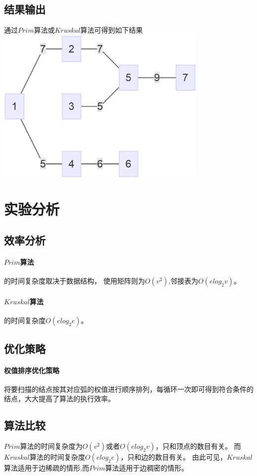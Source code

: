 \documentclass[a4paper,10pt]{ctexart}
\begin{document}
\subsection{结果输出}
通过$Prim$算法或$Kruskal$算法可得到如下结果\\
\includegraphics[height=3in]{../Pics/Test-MiniTree-out.eps}

\section{实验分析}
\subsection{效率分析}
\paragraph{$Prim$算法}的时间复杂度取决于数据结构，
使用矩阵则为$O(v^2)$,邻接表为$O(elog_2v)$。
\paragraph{$Kruskal$算法}的时间复杂度$O(elog_2e)$。

\subsection{优化策略}
\paragraph{权值排序优化策略}
将要扫描的结点按其对应弧的权值进行顺序排列，每循环一次即可得到符合条件的结点，大大提高了算法的执行效率。

\subsection{算法比较}
{$Prim$算法}的时间复杂度为$O(v^2)$或者$O(elog_2v)$，只和顶点的数目有关。
而{$Kruskal$算法}的时间复杂度$O(elog_2e)$，只和边的数目有关。
由此可见，$Kruskal$算法适用于边稀疏的情形,而$Prim$算法适用于边稠密的情形。
\end{document}
